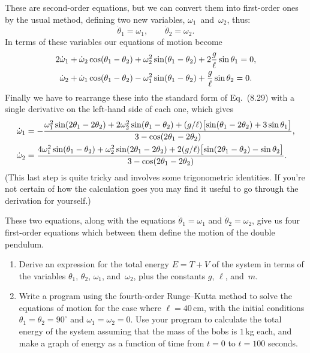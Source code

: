\documentclass[12pt]{article}
\begin{document}
\begin{exercises}
These are second-order equations, but we can convert them into first-order
ones by the usual method, defining two new variables,
$\omega_1$~and~$\omega_2$, thus:
\begin{displaymath}
\dot\theta_1 = \omega_1,\qquad \dot\theta_2 = \omega_2.
\end{displaymath}
In terms of these variables our equations of motion become
\begin{align*}
2\dot\omega_1 + \dot\omega_2 \cos(\theta_1-\theta_2)
  &+ \omega_2^2 \sin(\theta_1-\theta_2) + 2{g\over\ell} \sin\theta_1 = 0,
  \\
\dot\omega_2 + \dot\omega_1 \cos(\theta_1-\theta_2)
  &- \omega_1^2 \sin(\theta_1-\theta_2) + {g\over\ell} \sin\theta_2 = 0.
\end{align*}
Finally we have to rearrange these into the standard form of Eq.~(8.29)
with a single derivative on the left-hand side of each one, which gives
\begin{align*}
\dot\omega_1 &= - {\omega_1^2\sin(2\theta_1-2\theta_2)
                + 2\omega_2^2\sin(\theta_1-\theta_2)
                + (g/\ell) \bigl[ \sin(\theta_1-2\theta_2)
                                  + 3 \sin\theta_1 \bigr]\over
                 3 - \cos(2\theta_1-2\theta_2)}, \\
\dot\omega_2 &= {4\omega_1^2\sin(\theta_1-\theta_2)
                + \omega_2^2\sin(2\theta_1-2\theta_2)
                + 2(g/\ell) \bigl[ \sin(2\theta_1-\theta_2)
                                   - \sin\theta_2 \bigr]\over
                3 - \cos(2\theta_1-2\theta_2)}.
\end{align*}
(This last step is quite tricky and involves some trigonometric identities.
If you're not certain of how the calculation goes you may find it useful to
go through the derivation for yourself.)

These two equations, along with the equations $\dot{\theta}_1=\omega_1$ and
$\dot{\theta}_2=\omega_2$, give us four first-order equations which between
them define the motion of the double pendulum.
\begin{enumerate}\setlength{\itemsep}{0pt}
\item Derive an expression for the total energy $E = T + V$ of the system
  in terms of the variables $\theta_1$, $\theta_2$, $\omega_1$,
  and~$\omega_2$, plus the constants $g$, $\ell$, and~$m$.
\item Write a program using the fourth-order Runge--Kutta method to solve
  the equations of motion for the case where $\ell=40\,$cm, with the
  initial conditions $\theta_1=\theta_2=90^\circ$ and
  $\omega_1=\omega_2=0$.  Use your program to calculate the total energy of
  the system assuming that the mass of the bobs is $1\,$kg each, and make a
  graph of energy as a function of time from $t=0$ to $t=100$ seconds.


\end{enumerate}
\end{exercises}
\end{document}
